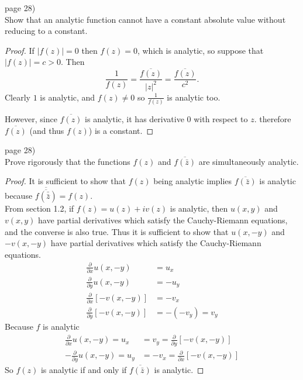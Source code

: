 \documentclass{article}
\newenvironment{problem}[2][Problem]{\begin{trivlist}
\item[\hskip \labelsep {\bfseries #1}\hskip \labelsep {\bfseries #2.}]}{\end{trivlist}}
\begin{document}
\pagebreak

\begin{problem}{4} (page 28) \\
  Show that an analytic function cannot have a constant absolute value without
  reducing to a constant.
\end{problem}

\begin{proof}
  If $|f(z)| = 0$ then $f(z) = 0$, which is analytic, so suppose that $|f(z)| = c > 0$.
  Then \[
    \frac{1}{f(z)} = \frac{\overline{f(z)}}{|z|^2} = \frac{\overline{f(z)}}{c^2}.
  \] Clearly $1$ is analytic, and $f(z) \not= 0$ so $\frac{1}{f(z)}$ is analytic too.

  However, since $\overline{f(z)}$ is analytic, it has derivative $0$ with
  respect to $z$. therefore $\overline{f(z)}$ (and thus $f(z)$) is a constant.
\end{proof}

\pagebreak

\begin{problem}{5} (page 28) \\
  Prove rigorously that the functions $f(z)$ and $\overline{f(\bar{z})}$ are simultaneously
  analytic.
\end{problem}

\begin{proof}
  It is sufficient to show that $f(z)$ being analytic implies $\overline{f(\bar{z})}$
  is analytic because $\overline{\overline{f(\bar{\bar{z}})}} = f(z)$.\\
  From section 1.2, if $f(z) = u(z) + iv(z)$ is analytic,
  then $u(x, y)$ and $v(x, y)$ have partial derivatives
  which satisfy the Cauchy-Riemann equations, and the converse is also true.
  Thus it is sufficient to show that $u(x, -y)$ and $-v(x, -y)$ have partial
  derivatives which satisfy the Cauchy-Riemann equations. \begin{align*}
    \frac{\partial}{\partial x} u(x, -y) &= u_x \\
    \frac{\partial}{\partial y} u(x, -y) &= -u_y \\
    \frac{\partial}{\partial x} [-v(x, -y)] &= -v_x \\
    \frac{\partial}{\partial y} [-v(x, -y)] &= -(-v_y) = v_y
  \end{align*}
  Because $f$ is analytic \begin{align*}
    \frac{\partial}{\partial x} u(x, -y) = u_x &= v_y = \frac{\partial}{\partial y} [-v(x, -y)] \\
    -\frac{\partial}{\partial y} u(x, -y) = u_y &= -v_x = \frac{\partial}{\partial x} [-v(x, -y)]
  \end{align*}
  So $f(z)$ is analytic if and only if $\overline{f(\bar{z})}$ is analytic.

\end{proof}
\end{document}
